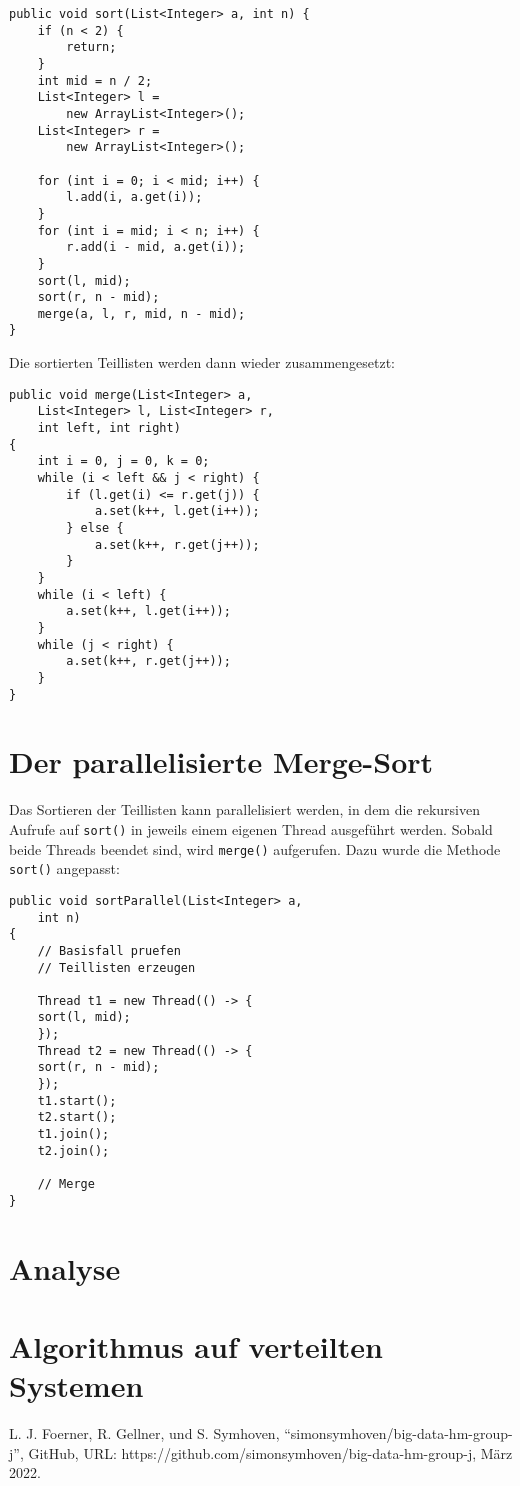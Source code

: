 \documentclass[conference]{IEEEtran}
\begin{document}
\begin{lstlisting}
public void sort(List<Integer> a, int n) {
    if (n < 2) {
        return;
    }
    int mid = n / 2;
    List<Integer> l = 
    	new ArrayList<Integer>();
    List<Integer> r = 
    	new ArrayList<Integer>();

    for (int i = 0; i < mid; i++) {
        l.add(i, a.get(i));
    }
    for (int i = mid; i < n; i++) {
        r.add(i - mid, a.get(i));
    }
    sort(l, mid);
    sort(r, n - mid);
    merge(a, l, r, mid, n - mid);
}
\end{lstlisting}

Die sortierten Teillisten werden dann wieder zusammengesetzt:

\begin{lstlisting}
public void merge(List<Integer> a, 
	List<Integer> l, List<Integer> r, 
	int left, int right) 
{
    int i = 0, j = 0, k = 0;
    while (i < left && j < right) {
        if (l.get(i) <= r.get(j)) {
            a.set(k++, l.get(i++));
        } else {
            a.set(k++, r.get(j++));
        }
    }
    while (i < left) {
        a.set(k++, l.get(i++));
    }
    while (j < right) {
        a.set(k++, r.get(j++));
    }
}
\end{lstlisting}

\section{Der parallelisierte Merge-Sort}
Das Sortieren der Teillisten kann parallelisiert werden, in dem die rekursiven Aufrufe auf \verb|sort()| in jeweils einem eigenen Thread ausgeführt werden. Sobald beide Threads beendet sind, wird \verb|merge()| aufgerufen. 
Dazu wurde die Methode \verb|sort()| angepasst:

\begin{lstlisting}
public void sortParallel(List<Integer> a, 
	int n) 
{
    // Basisfall pruefen
    // Teillisten erzeugen
    
    Thread t1 = new Thread(() -> {
	sort(l, mid);
    });
    Thread t2 = new Thread(() -> {
	sort(r, n - mid);
    });
    t1.start();
    t2.start();
    t1.join();
    t2.join();
		
    // Merge    
}
\end{lstlisting}

\section{Analyse}

\section{Algorithmus auf verteilten Systemen}


\begin{thebibliography}{00}
 L. J. Foerner, R. Gellner, und S. Symhoven, ``simonsymhoven/big-data-hm-group-j'', GitHub, URL: https://github.com/simonsymhoven/big-data-hm-group-j, März 2022.
\end{thebibliography}
\end{document}
